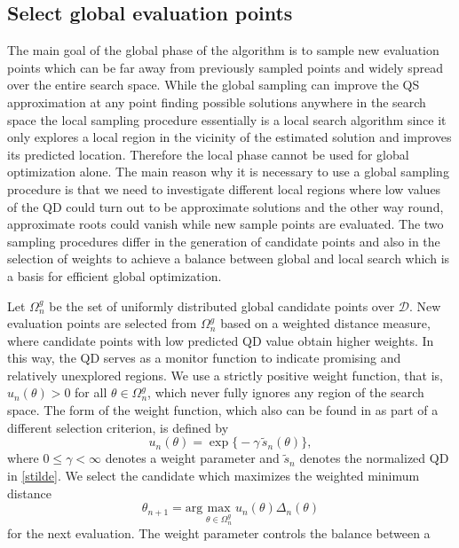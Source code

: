 \documentclass[article, nojss]{jss}
\numberwithin{equation}{section}			%
\newcommand{\D}{\mathcal{D}}
\begin{document}
\subsection{Select global evaluation points}\label{subsec:global}
The main goal of the global phase of the algorithm is to sample new
evaluation points which can be far away from previously sampled points and widely
spread over the entire search space. While the global sampling can improve the
QS approximation at any point finding possible solutions anywhere in the search
space the local sampling procedure essentially is a local search algorithm since it only
explores a local region in the vicinity of the estimated solution and improves its
predicted location. Therefore the local phase cannot be used for global
optimization alone. The main reason why it is necessary to use a global sampling procedure
is that we need to investigate different local regions where low values of the
QD could turn out to be approximate solutions and the other way round, approximate
roots could vanish while new sample points are evaluated. The two sampling
procedures differ in the generation of candidate points and also in the selection of
weights to achieve a balance between global and local search which is a basis
for efficient global optimization.\par
%
Let $\Omega^g_n$ be the set of uniformly distributed global candidate points
over $\D$. New evaluation points are selected from $\Omega^g_n$ based on a
weighted distance measure, where candidate points with low predicted QD value
obtain higher weights. In this way, the QD serves as a monitor function to
indicate promising and relatively unexplored regions. We use a strictly
positive weight function, that is, $u_n(\theta)>0$ for all $\theta\in\Omega^g_n$,
which never fully ignores any region of the search space. The form of the
weight function, which also can be found in \citet{ref:Jakobsson2010} as part of
a different selection criterion, is defined by
\begin{equation}
 u_n(\theta) = \exp\Big\{ -\gamma \, \tilde{s}_n(\theta) \Big\},
\end{equation}
where $0\leq\gamma<\infty$ denotes a weight parameter and $\tilde{s}_n$
denotes the normalized QD in \eqref{stilde}.
We select the candidate which maximizes the weighted minimum distance
\begin{equation}\label{globsamp}
  \theta_{n+1} = \text{arg}\max_{\theta\in\Omega^{g}_n} u_n(\theta)\Delta_n(\theta)
\end{equation}
for the next evaluation. The weight parameter controls the balance between a
\end{document}
